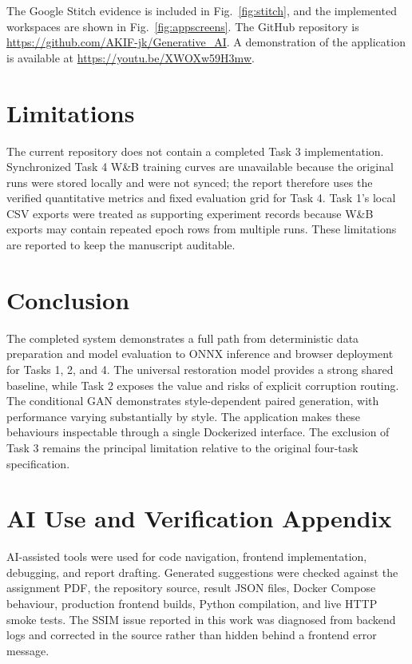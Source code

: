 \documentclass[conference]{IEEEtran}
\begin{document}
The Google Stitch evidence is included in Fig.~\ref{fig:stitch}, and the implemented workspaces are shown in Fig.~\ref{fig:appscreens}. The GitHub repository is \url{https://github.com/AKIF-jk/Generative_AI}. A demonstration of the application is available at \url{https://youtu.be/XWOXw59H3mw}.

\section{Limitations}
The current repository does not contain a completed Task 3 implementation. Synchronized Task 4 W\&B training curves are unavailable because the original runs were stored locally and were not synced; the report therefore uses the verified quantitative metrics and fixed evaluation grid for Task 4. Task 1's local CSV exports were treated as supporting experiment records because W\&B exports may contain repeated epoch rows from multiple runs. These limitations are reported to keep the manuscript auditable.

\section{Conclusion}
The completed system demonstrates a full path from deterministic data preparation and model evaluation to ONNX inference and browser deployment for Tasks 1, 2, and 4. The universal restoration model provides a strong shared baseline, while Task 2 exposes the value and risks of explicit corruption routing. The conditional GAN demonstrates style-dependent paired generation, with performance varying substantially by style. The application makes these behaviours inspectable through a single Dockerized interface. The exclusion of Task 3 remains the principal limitation relative to the original four-task specification.

\section*{AI Use and Verification Appendix}
AI-assisted tools were used for code navigation, frontend implementation, debugging, and report drafting. Generated suggestions were checked against the assignment PDF, the repository source, result JSON files, Docker Compose behaviour, production frontend builds, Python compilation, and live HTTP smoke tests. The SSIM issue reported in this work was diagnosed from backend logs and corrected in the source rather than hidden behind a frontend error message.
\end{document}
